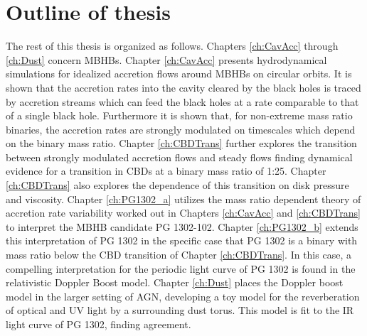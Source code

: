 

















\section{Outline of thesis}   

The rest of this thesis is organized as follows. Chapters \ref{ch:CavAcc}
through \ref{ch:Dust} concern MBHBs. Chapter \ref{ch:CavAcc} presents
hydrodynamical simulations for idealized accretion flows around MBHBs on
circular orbits. It is shown that the accretion rates into the cavity cleared
by the black holes is traced by accretion streams which can feed the black
holes at a rate comparable to that of a single black hole. Furthermore it is
shown that, for non-extreme mass ratio binaries, the accretion rates are
strongly modulated on timescales which depend on the binary mass ratio.
Chapter \ref{ch:CBDTrans} further explores the transition between strongly
modulated accretion flows and steady flows finding dynamical evidence for a
transition in CBDs at a binary mass ratio of 1:25. Chapter \ref{ch:CBDTrans}
also explores the dependence of this transition on disk pressure and
viscosity. Chapter \ref{ch:PG1302_a} utilizes the mass ratio dependent theory
of accretion rate variability worked out in Chapters \ref{ch:CavAcc} and
\ref{ch:CBDTrans} to interpret the MBHB candidate PG 1302-102. Chapter
\ref{ch:PG1302_b} extends this interpretation of PG 1302 in the specific case
that PG 1302 is a binary with mass ratio below the CBD transition of Chapter
\ref{ch:CBDTrans}. In this case, a compelling interpretation for the periodic
light curve of PG 1302 is found in the relativistic Doppler Boost model.
Chapter \ref{ch:Dust} places the Doppler boost model in the larger setting of
AGN, developing a toy model for the reverberation of optical and UV light by a
surrounding dust torus. This model is fit to the IR light curve of PG 1302,
finding agreement.

